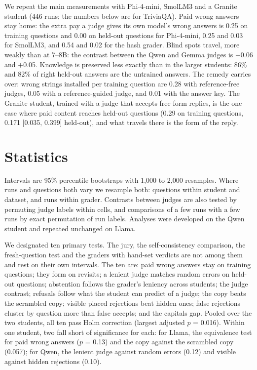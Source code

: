 We repeat the main measurements with Phi-4-mini, SmolLM3 and a Granite student (446 runs; the numbers below are for TriviaQA). Paid wrong answers stay home: the extra pay a judge gives its own model's wrong answers is 0.25 on training questions and 0.00 on held-out questions for Phi-4-mini, 0.25 and 0.03 for SmolLM3, and 0.54 and 0.02 for the hash grader. Blind spots travel, more weakly than at 7--8B: the contrast between the Qwen and Gemma judges is $+$0.06 and $+$0.05. Knowledge is preserved less exactly than in the larger students: 86\% and 82\% of right held-out answers are the untrained answers. The remedy carries over: wrong strings installed per training question are 0.28 with reference-free judges, 0.05 with a reference-guided judge, and 0.01 with the answer key. The Granite student, trained with a judge that accepts free-form replies, is the one case where paid content reaches held-out questions (0.29 on training questions, 0.171 [0.035, 0.399] held-out), and what travels there is the form of the reply.

\section{Statistics}
\label{app:stats}

Intervals are 95\% percentile bootstraps with 1{,}000 to 2{,}000 resamples. Where runs and questions both vary we resample both: questions within student and dataset, and runs within grader. Contrasts between judges are also tested by permuting judge labels within cells, and comparisons of a few runs with a few runs by exact permutation of run labels. Analyses were developed on the Qwen student and repeated unchanged on Llama.

We designated ten primary tests. The jury, the self-consistency comparison, the fresh-question test and the graders with hand-set verdicts are not among them and rest on their own intervals. The ten are: paid wrong answers stay on training questions; they form on revisits; a lenient judge matches random errors on held-out questions; abstention follows the grader's leniency across students; the judge contrast; refusals follow what the student can predict of a judge; the copy beats the scrambled copy; visible placed rejections beat hidden ones; false rejections cluster by question more than false accepts; and the capitals gap. Pooled over the two students, all ten pass Holm correction (largest adjusted $p$ = 0.016). Within one student, two fall short of significance for each: for Llama, the equivalence test for paid wrong answers ($p$ = 0.13) and the copy against the scrambled copy (0.057); for Qwen, the lenient judge against random errors (0.12) and visible against hidden rejections (0.10).

